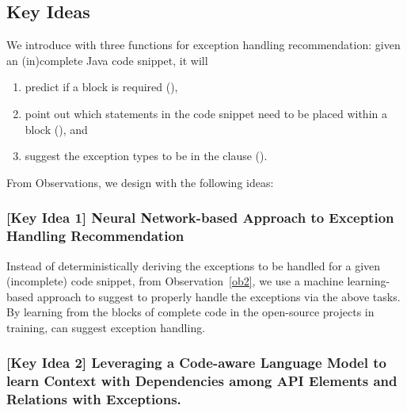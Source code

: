 \subsection{Key Ideas}
\label{key:sec}

We introduce {\tool} with three functions for exception handling
recommendation: given an (in)complete Java code snippet, it will

\vspace{-3pt}
\begin{enumerate}

\item predict if a  block is required ({\xblock}),

\item point out which statements in the code snippet need to be placed within
a  block ({\xstate}), and

\item suggest the exception types to be in the 
clause ({\xtype}).

\end{enumerate}

From Observations, we design {\tool} with the following
ideas:

\subsubsection{[Key Idea 1] Neural Network-based Approach to Exception Handling Recommendation}
Instead of deterministically deriving the exceptions to be handled for
a given (incomplete) code snippet, from Observation~\ref{ob2}, we
use a machine learning-based approach to suggest to properly handle the
exceptions via the above tasks.
By learning from the  blocks of complete code in
the open-source projects in training, {\tool} can
suggest exception handling.




\subsubsection{[Key Idea 2] Leveraging a Code-aware Language Model to learn Context with Dependencies among API Elements and Relations with Exceptions.}
  
